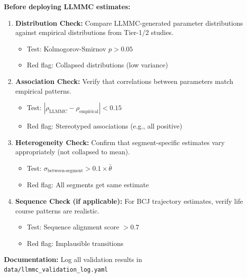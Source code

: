 \begin{tcolorbox}[colback=green!5!white, colframe=green!75!black,
    title=LLMMC Validation Protocol (Population Realism)]

\textbf{Before deploying LLMMC estimates:}

\begin{enumerate}
\item \textbf{Distribution Check:} Compare LLMMC-generated parameter distributions
against empirical distributions from Tier-1/2 studies.
\begin{itemize}[nosep]
\item Test: Kolmogorov-Smirnov $p > 0.05$
\item Red flag: Collapsed distributions (low variance)
\end{itemize}

\item \textbf{Association Check:} Verify that correlations between parameters
match empirical patterns.
\begin{itemize}[nosep]
\item Test: $|\rho_{\text{LLMMC}} - \rho_{\text{empirical}}| < 0.15$
\item Red flag: Stereotyped associations (e.g., all positive)
\end{itemize}

\item \textbf{Heterogeneity Check:} Confirm that segment-specific estimates
vary appropriately (not collapsed to mean).
\begin{itemize}[nosep]
\item Test: $\sigma_{\text{between-segment}} > 0.1 \times \bar{\theta}$
\item Red flag: All segments get same estimate
\end{itemize}

\item \textbf{Sequence Check (if applicable):} For BCJ trajectory estimates,
verify life course patterns are realistic.
\begin{itemize}[nosep]
\item Test: Sequence alignment score $> 0.7$
\item Red flag: Implausible transitions
\end{itemize}
\end{enumerate}

\textbf{Documentation:} Log all validation results in \texttt{data/llmmc\_validation\_log.yaml}

\end{tcolorbox}

